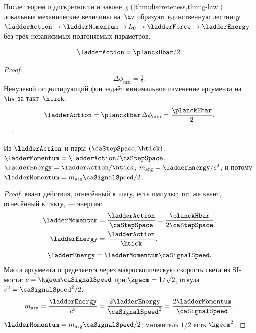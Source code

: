 \begin{theorem}
\label{thm:51}
После теорем о дискретности и законе~$g$ (\cref{thm:discreteness,thm:g-law}) локальные механические величины на~$\hv$ образуют
единственную лестницу $\ladderAction\to \ladderMomentum\to L_0\to \ladderForce\to \ladderEnergy$
без трёх независимых подгоняемых параметров.
\end{theorem}

\begin{lemma}[5.1a]
\label{lem:51a}
\[
  \ladderAction=\planckHbar/2.
\]
\end{lemma}

\begin{proof}
\[
  \Delta\phi_{\min}=\tfrac12.
\]
Ненулевой осциллирующий фон задаёт минимальное изменение аргумента на~$\hv$ за такт~$\htick$.
\pfollows
\[
  \ladderAction=\planckHbar\,\Delta\phi_{\min}=\frac{\planckHbar}{2}.
\]
\end{proof}

\begin{lemma}[5.1b]
\label{lem:51b}
Из $\ladderAction$ и пары $(\caStepSpace,\htick)$: $\ladderMomentum=\ladderAction/\caStepSpace$, $\ladderEnergy=\ladderAction/\htick$, $m_{\arg}=\ladderEnergy/c^2$,
и потому $\ladderMomentum=m_{\arg} \caSignalSpeed/2$.
\end{lemma}

\begin{proof}
квант действия, отнесённый к шагу, есть импульс; тот же квант, отнесённый к такту, --- энергия:
\begin{align}
  \ladderMomentum &= \frac{\ladderAction}{\caStepSpace} = \frac{\planckHbar}{2\caStepSpace}, \\
  \ladderEnergy &= \frac{\ladderAction}{\htick}.
\end{align}
\[
  \ladderEnergy=\ladderMomentum \caSignalSpeed.
\]
Масса аргумента определяется через макроскопическую скорость света из SI-моста:
$c=\kgeom \caSignalSpeed$ при $\kgeom=1/\sqrt{2}$, откуда $c^2=\caSignalSpeed^2/2$.
\[
  m_{\arg}=\frac{\ladderEnergy}{c^2}=\frac{2\ladderEnergy}{\caSignalSpeed^2}=\frac{2\ladderMomentum}{\caSignalSpeed}.
\]
\pfollows $\ladderMomentum=m_{\arg} \caSignalSpeed/2$; множитель $1/2$ есть $\kgeom^2$.
\end{proof}

